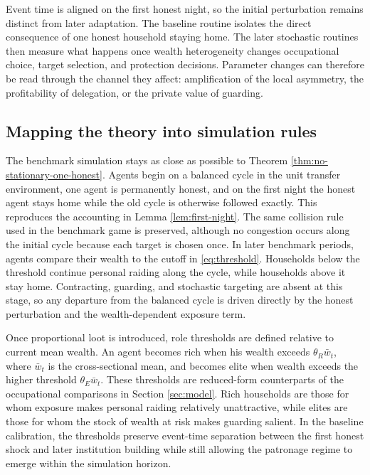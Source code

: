 Event time is aligned on the first honest night, so the initial perturbation remains distinct from later adaptation. The baseline routine isolates the direct consequence of one honest household staying home. The later stochastic routines then measure what happens once wealth heterogeneity changes occupational choice, target selection, and protection decisions. Parameter changes can therefore be read through the channel they affect: amplification of the local asymmetry, the profitability of delegation, or the private value of guarding.

\subsection{Mapping the theory into simulation rules}

The benchmark simulation stays as close as possible to Theorem \ref{thm:no-stationary-one-honest}. Agents begin on a balanced cycle in the unit transfer environment, one agent is permanently honest, and on the first night the honest agent stays home while the old cycle is otherwise followed exactly. This reproduces the accounting in Lemma \ref{lem:first-night}. The same collision rule used in the benchmark game is preserved, although no congestion occurs along the initial cycle because each target is chosen once. In later benchmark periods, agents compare their wealth to the cutoff in \eqref{eq:threshold}. Households below the threshold continue personal raiding along the cycle, while households above it stay home. Contracting, guarding, and stochastic targeting are absent at this stage, so any departure from the balanced cycle is driven directly by the honest perturbation and the wealth-dependent exposure term.

Once proportional loot is introduced, role thresholds are defined relative to current mean wealth. An agent becomes rich when his wealth exceeds $\theta_R \bar{w}_t$, where $\bar{w}_t$ is the cross-sectional mean, and becomes elite when wealth exceeds the higher threshold $\theta_E \bar{w}_t$. These thresholds are reduced-form counterparts of the occupational comparisons in Section \ref{sec:model}. Rich households are those for whom exposure makes personal raiding relatively unattractive, while elites are those for whom the stock of wealth at risk makes guarding salient. In the baseline calibration, the thresholds preserve event-time separation between the first honest shock and later institution building while still allowing the patronage regime to emerge within the simulation horizon.

